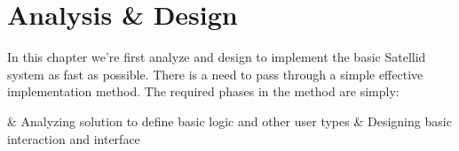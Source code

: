 \chapter{Analysis \& Design}
\label{chap:analysis-design}

In this chapter we're first analyze and design to implement the basic Satellid system as fast as possible.
There is a need to pass through a simple effective implementation method.
The required phases in the method are simply:

\begin{easylist}
& Analyzing solution to define basic logic and other user types
& Designing basic interaction and interface
\end{easylist}


